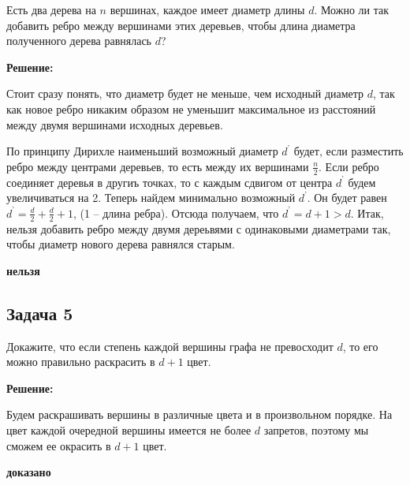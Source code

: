 \documentclass[a4paper,14pt]{article} %
\begin{document}
Есть два дерева на $ n$ вершинах, каждое имеет диаметр длины $d$.
Можно ли так добавить ребро между вершинами этих деревьев, чтобы
длина диаметра полученного дерева равнялась $d$? 
\begin{center}
\bfseries
{\Large Решение: }
\end{center}

Стоит сразу понять, что диаметр будет не меньше, чем исходный диаметр $d$, так как новое ребро никаким образом не уменьшит максимальное из расстояний между двумя вершинами исходных деревьев.

По принципу Дирихле наименьший возможный диаметр $d^{\textbf{'}}$ будет, если разместить ребро между центрами деревьев, то есть между их вершинами $\frac{n}{2}$. Если ребро соединяет деревья в другиъ точках, то с каждым сдвигом от центра $d^{\textbf{'}}$ будем увеличиваться на 2. Теперь найдем минимально возможный $d^{\textbf{'}}$. Он будет равен $d^{\textbf{'}} = \frac{d}{2} + \frac{d}{2}+ 1$, (1 -- длина ребра). Отсюда получаем, что $d^{\textbf{'}} = d + 1 > d$. Итак, нельзя добавить ребро между двумя дереьвями с одинаковыми диаметрами так, чтобы диаметр нового дерева равнялся старым.

\begin{flushright}
\begin{large}
\textbf {нельзя }
\end{large}
\end{flushright}


\begin{center}
\subsection{Задача 5}
\end{center}

 Докажите, что если степень каждой вершины графа не превосходит
$d$, то его можно правильно раскрасить в $d + 1$ цвет.
\begin{center}
\bfseries
{\Large Решение: }
\end{center}

Будем раскрашивать вершины в различные цвета и в произвольном порядке.
На цвет каждой очередной вершины имеется не более $d$ запретов, поэтому
мы сможем ее окрасить в $d+1$ цвет.\\

\begin{flushright}
\begin{large}
\textbf {доказано}
\end{large}
\end{flushright}
\end{document}
